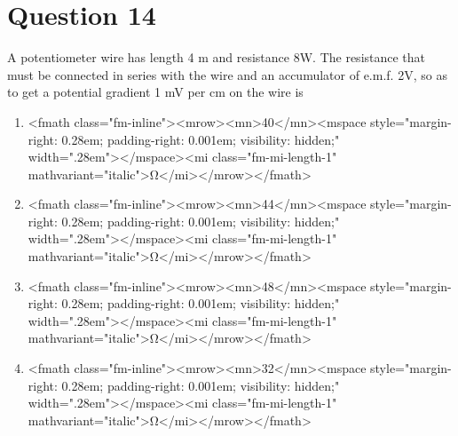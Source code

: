 \documentclass{article}
\begin{document}
\section*{Question 14}
A potentiometer wire has length 4 m and resistance 8W. The resistance that must be connected in series with the wire and an accumulator of e.m.f. 2V, so as to get a potential gradient 1 mV per cm on the wire is 
\begin{enumerate}[label=(\alph*)]
\item <fmath class="fm-inline"><mrow><mn>40</mn><mspace style="margin-right: 0.28em; padding-right: 0.001em; visibility: hidden;" width=".28em">‌</mspace><mi class="fm-mi-length-1" mathvariant="italic">Ω</mi></mrow></fmath>
\item <fmath class="fm-inline"><mrow><mn>44</mn><mspace style="margin-right: 0.28em; padding-right: 0.001em; visibility: hidden;" width=".28em">‌</mspace><mi class="fm-mi-length-1" mathvariant="italic">Ω</mi></mrow></fmath>
\item <fmath class="fm-inline"><mrow><mn>48</mn><mspace style="margin-right: 0.28em; padding-right: 0.001em; visibility: hidden;" width=".28em">‌</mspace><mi class="fm-mi-length-1" mathvariant="italic">Ω</mi></mrow></fmath>
\item <fmath class="fm-inline"><mrow><mn>32</mn><mspace style="margin-right: 0.28em; padding-right: 0.001em; visibility: hidden;" width=".28em">‌</mspace><mi class="fm-mi-length-1" mathvariant="italic">Ω</mi></mrow></fmath>
\end{enumerate}
\newpage
\end{document}
